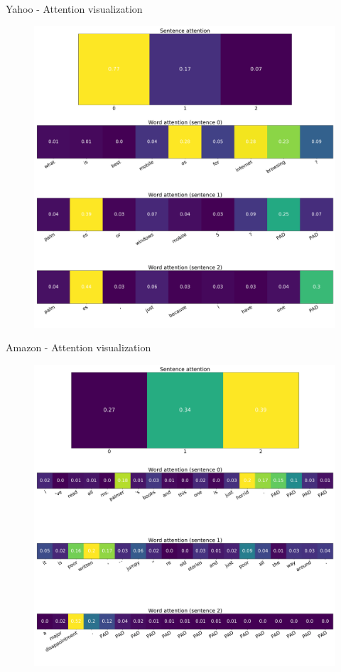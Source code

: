 \documentclass[10pt]{beamer}
\begin{document}
\begin{frame}{Yahoo - Attention visualization}

\begin{figure}
\centering
\includegraphics[scale=0.15]{img/yahoo-han-visual}
\end{figure}

\end{frame}


\begin{frame}{Amazon - Attention visualization}

\begin{figure}
\centering
\includegraphics[scale=0.15]{img/amazon-han-visual}
\end{figure}

\end{frame}
\end{document}
